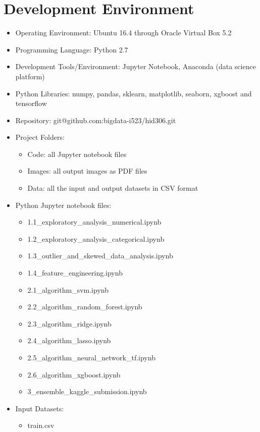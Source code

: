 \documentclass[sigconf]{acmart}
\begin{document}
	\section{Development Environment}
	
	\begin{itemize}
		\item Operating Environment: Ubuntu 16.4 through Oracle Virtual Box 5.2
		\item Programming Language: Python 2.7
		\item Development Tools/Environment: Jupyter Notebook, Anaconda (data science platform)
		\item Python Libraries: numpy, pandas, sklearn, matplotlib, seaborn, xgboost and tensorflow
		\item Repository: git@github.com:bigdata-i523/hid306.git
		\item Project Folders:
		\begin{itemize}
			\item Code: all Jupyter notebook files
			\item Images: all output images as PDF files
			\item Data: all the input and output datasets in CSV format
		\end{itemize}
		\item Python Jupyter notebook files:
		\begin{itemize}
			\item 1.1\_exploratory\_analysis\_numerical.ipynb
			\item 1.2\_exploratory\_analysis\_categorical.ipynb
			\item 1.3\_outlier\_and\_skewed\_data\_analysis.ipynb
			\item 1.4\_feature\_engineering.ipynb
			\item 2.1\_algorithm\_svm.ipynb
			\item 2.2\_algorithm\_random\_forest.ipynb
			\item 2.3\_algorithm\_ridge.ipynb
			\item 2.4\_algorithm\_lasso.ipynb
			\item 2.5\_algorithm\_neural\_network\_tf.ipynb
			\item 2.6\_algorithm\_xgboost.ipynb
			\item 3\_ensemble\_kaggle\_submission.ipynb	    	
		\end{itemize}
		\item Input Datasets: 
		\begin{itemize}
			\item train.csv

\end{itemize}
\end{itemize}
\end{document}
